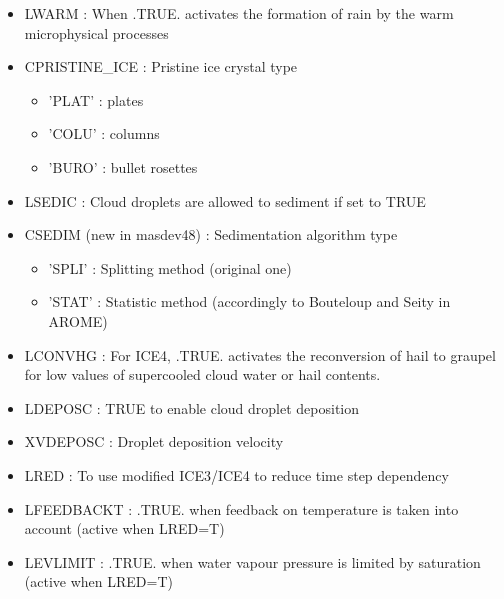\begin{itemize}
\item
LWARM : When .TRUE. activates the
formation of rain by the warm microphysical processes

\item
CPRISTINE\_ICE :
Pristine ice crystal type
\begin{itemize}
\item{'PLAT'} : plates 
\item{'COLU'} : columns
\item{'BURO'} : bullet rosettes
\end{itemize}

\item
LSEDIC :
Cloud droplets are allowed to sediment if set to TRUE
\item
CSEDIM (new in masdev48) :
Sedimentation algorithm type
\begin{itemize}
\item{'SPLI'} : Splitting method (original one)
\item{'STAT'} : Statistic method (accordingly to Bouteloup and Seity in AROME) 
\end{itemize}

\item
LCONVHG : For ICE4, .TRUE. activates the
reconversion of hail to graupel for low values of supercooled cloud water or hail contents.

\item
LDEPOSC : TRUE to enable cloud droplet deposition

\item
XVDEPOSC : Droplet deposition velocity

\item 
LRED  : To use modified ICE3/ICE4 to reduce time step dependency

\item 
LFEEDBACKT  :  .TRUE. when feedback on temperature is taken into account (active when LRED=T)

\item 
LEVLIMIT  : .TRUE. when water vapour pressure is limited by saturation (active when LRED=T)


\end{itemize}
